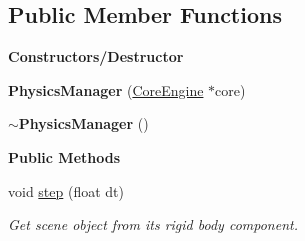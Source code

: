 \subsection*{Public Member Functions}
\begin{Indent}\textbf{ Constructors/\+Destructor}\par
\begin{DoxyCompactItemize}
\item 
\mbox{\label{classrev_1_1_physics_manager_aec636fa9e93013fba2a8cc167f75a502}} 
{\bfseries Physics\+Manager} (\mbox{\hyperlink{classrev_1_1_core_engine}{Core\+Engine}} $\ast$core)
\item 
\mbox{\label{classrev_1_1_physics_manager_a69421e813acce39e43057f509ddb168f}} 
{\bfseries $\sim$\+Physics\+Manager} ()
\end{DoxyCompactItemize}
\end{Indent}
\begin{Indent}\textbf{ Public Methods}\par
\begin{DoxyCompactItemize}
\item 
void \mbox{\hyperlink{classrev_1_1_physics_manager_a9da09ceba8ff4b0f44821e7c4b43acf4}{step}} (float dt)
\begin{DoxyCompactList}\small\item\em Get scene object from its rigid body component. \end{DoxyCompactList}\end{DoxyCompactItemize}
\end{Indent}

